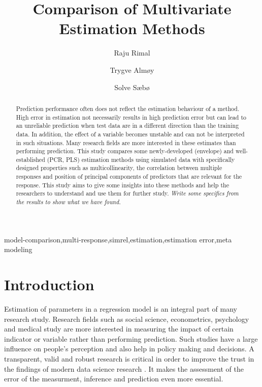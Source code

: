 \documentclass[12pt,3p,authoryear]{elsarticle}
\begin{document}
\begin{frontmatter}

  \title{Comparison of Multivariate Estimation Methods}
  
    \author[KBM]{Raju Rimal}
    \author[KBM]{Trygve Almøy}
  
    \author[NMBU]{Solve Sæbø}
  
      \address[KBM]{Faculty of Chemistry and Bioinformatics, Norwegian University of Life
Sciences, Ås, Norway}
    \address[NMBU]{Prorector, Norwegian University of Life Sciences, Ås, Norway}
  
  \begin{abstract}
  Prediction performance often does not reflect the estimation behaviour
  of a method. High error in estimation not necessarily results in high
  prediction error but can lead to an unreliable prediction when test data
  are in a different direction than the training data. In addition, the
  effect of a variable becomes unstable and can not be interpreted in such
  situations. Many research fields are more interested in these estimates
  than performing prediction. This study compares some newly-developed
  (envelope) and well-established (PCR, PLS) estimation methods using
  simulated data with specifically designed properties such as
  multicollinearity, the correlation between multiple responses and
  position of principal components of predictors that are relevant for the
  response. This study aims to give some insights into these methods and
  help the researchers to understand and use them for further study.
  \emph{Write some specifics from the results to show what we have found.}
  \end{abstract}
   \begin{keyword} model-comparison,multi-response,simrel,estimation,estimation error,meta modeling\end{keyword}

\end{frontmatter}

\section{Introduction}\label{introduction}

Estimation of parameters in a regression model is an integral part of
many research study. Research fields such as social science,
econometrics, psychology and medical study are more interested in
measuring the impact of certain indicator or variable rather than
performing prediction. Such studies have a large influence on people's
perception and also help in policy making and decisions. A transparent,
valid and robust research is critical in order to improve the trust in
the findings of modern data science research \citep{eu2019auethics}. It
makes the assessment of the error of the measurment, inference and
prediction even more essential.
\end{document}
